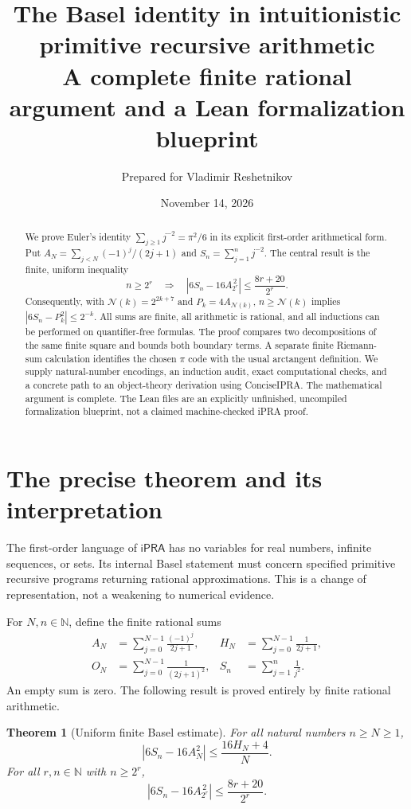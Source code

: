 \documentclass[11pt,a4paper]{article}
\title{\textbf{The Basel identity in intuitionistic\\
primitive recursive arithmetic}\\[5pt]
\large A complete finite rational argument and a Lean formalization blueprint}
\author{Prepared for Vladimir Reshetnikov}
\date{November 14, 2026}
\newtheorem{theorem}{Theorem}[section]
\theoremstyle{remark}\newtheorem{remark}[theorem]{Remark}
\newcommand{\N}{\mathbb N}
\newcommand{\ipra}{\mathsf{iPRA}}
\newcommand{\abs}[1]{\left|#1\right|}
\newcommand{\cut}{\mathcal N}
\begin{document}
\maketitle
\begin{abstract}
We prove Euler's identity $\sum_{j\ge1}j^{-2}=\pi^2/6$ in its explicit
first-order arithmetical form. Put
$A_N=\sum_{j<N}(-1)^j/(2j+1)$ and $S_n=\sum_{j=1}^n j^{-2}$.
The central result is the finite, uniform inequality
\[
 n\ge2^r\quad\Longrightarrow\quad
 \abs{6S_n-16A_{2^r}^{\,2}}\le\frac{8r+20}{2^r}.
\]
Consequently, with $\cut(k)=2^{2k+7}$ and $P_k=4A_{\cut(k)}$,
$n\ge\cut(k)$ implies $\abs{6S_n-P_k^2}\le2^{-k}$.
All sums are finite, all arithmetic is rational, and all inductions can
be performed on quantifier-free formulas. The proof compares two
decompositions of the same finite square and bounds both boundary
terms. A separate finite Riemann-sum calculation identifies the
chosen $\pi$ code with the usual arctangent definition. We supply
natural-number encodings, an induction audit, exact computational
checks, and a concrete path to an object-theory derivation using
ConciseIPRA. The mathematical argument is complete. The Lean files
are an explicitly unfinished, uncompiled formalization blueprint,
not a claimed machine-checked iPRA proof.
\end{abstract}
\setcounter{tocdepth}{1}
\begingroup\small\tableofcontents\endgroup
\newpage

\section{The precise theorem and its interpretation}\label{sec:statement}

The first-order language of $\ipra$ has no variables for real numbers,
infinite sequences, or sets. Its internal Basel statement must concern
specified primitive recursive programs returning rational
approximations. This is a change of representation, not a weakening to
numerical evidence.

For $N,n\in\N$, define the finite rational sums
\begin{align}
 A_N&=\sum_{j=0}^{N-1}\frac{(-1)^j}{2j+1},&
 H_N&=\sum_{j=0}^{N-1}\frac1{2j+1},\label{eq:AH}\\
 O_N&=\sum_{j=0}^{N-1}\frac1{(2j+1)^2},&
 S_n&=\sum_{j=1}^{n}\frac1{j^2}.\label{eq:OS}
\end{align}
An empty sum is zero. The following result is proved entirely by
finite rational arithmetic.

\begin{theorem}[Uniform finite Basel estimate]\label{thm:uniform}
For all natural numbers $n\ge N\ge1$,
\begin{equation}\label{eq:uniform}
 \boxed{\displaystyle\abs{6S_n-16A_N^2}\le\frac{16H_N+4}{N}.}
\end{equation}
For all $r,n\in\N$ with $n\ge2^r$,
\begin{equation}\label{eq:dyadic}
 \boxed{\displaystyle\abs{6S_n-16A_{2^r}^{\,2}}\le\frac{8r+20}{2^r}.}
\end{equation}
\end{theorem}
\end{document}
